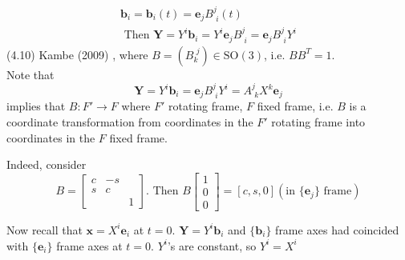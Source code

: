 \begin{equation}
\begin{gathered}
	\mathbf{b}_i = \mathbf{b}_i(t) = \mathbf{e}_j B^j_{\, \, i}(t) \\
		\text{ Then } \mathbf{Y} = Y^i \mathbf{b}_i = Y^i \mathbf{e}_j B^j_{ \, \, i} = \mathbf{e}_j B^j_{\, \, i } Y^i
\end{gathered}
\end{equation} 
(4.10) Kambe (2009) \cite{dgdt:TKambe2009}, where $B = (B_k^{\, \, j}) \in \text{SO}(3)$, i.e. $BB^T = 1$. \\

Note that 
\begin{equation}
	\mathbf{Y} = Y^i \mathbf{b}_i = \mathbf{e}_j B^j_{\, \, i} Y^i = A^j_{\, \, k} X^k \mathbf{e}_j 
\end{equation}
implies that $B: F' \to F$ where $F'$ rotating frame, $F$ fixed frame, i.e. $B$ is a coordinate transformation from coordinates in the $F'$ rotating frame into coordinates in the $F$ fixed frame.

Indeed, consider 
\[
B = \left[ \begin{matrix} c & -s & \\ s & c & \\ & & 1 \end{matrix} \right]. \text{ Then } B \left[ \begin{matrix} 1 \\ 0 \\ 0 \end{matrix} \right] = [c, s, 0] (\text{in $\lbrace \mathbf{e}_j \rbrace$ frame})
\]







































Now recall that $\mathbf{x} = X^i \mathbf{e}_i$ at $t=0$. $\mathbf{Y} = Y^i \mathbf{b}_i$ and $\lbrace \mathbf{b}_i \rbrace$ frame axes had coincided with $\lbrace \mathbf{e}_i \rbrace$ frame axes at $t=0$. $Y^i$'s are constant, so $Y^i = X^i$

